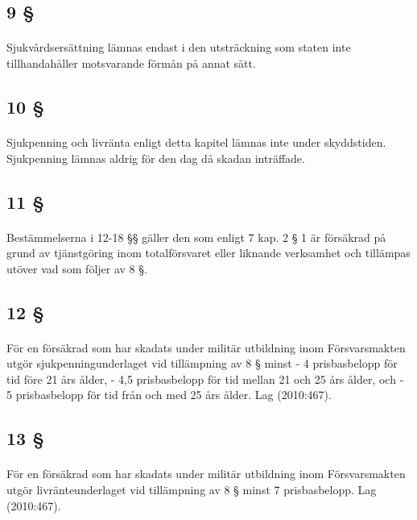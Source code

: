 \documentclass[a4paper,notitlepage,openany,10pt]{book}
\begin{document}
\subsection*{9 §}
\paragraph*{}
Sjukvårdsersättning lämnas endast i den utsträckning som staten inte tillhandahåller motsvarande förmån på annat sätt.
\subsection*{10 §}
\paragraph*{}
Sjukpenning och livränta enligt detta kapitel lämnas inte under skyddstiden. Sjukpenning lämnas aldrig för den dag då skadan inträffade.
\subsection*{11 §}
\paragraph*{}
Bestämmelserna i 12-18 §§ gäller den som enligt 7 kap. 2 § 1 är försäkrad på grund av tjänstgöring inom totalförsvaret eller liknande verksamhet och tillämpas utöver vad som följer av 8 §.
\subsection*{12 §}
\paragraph*{}
För en försäkrad som har skadats under militär utbildning inom Försvarsmakten utgör sjukpenningunderlaget vid tillämpning av 8 § minst
\newline - 4 prisbasbelopp för tid före 21 års ålder,
\newline - 4,5 prisbasbelopp för tid mellan 21 och 25 års ålder, och
\newline - 5 prisbasbelopp för tid från och med 25 års ålder.
Lag (2010:467).
\subsection*{13 §}
\paragraph*{}
För en försäkrad som har skadats under militär utbildning inom Försvarsmakten utgör livränteunderlaget vid tillämpning av 8 § minst 7 prisbasbelopp.
Lag (2010:467).
\end{document}
